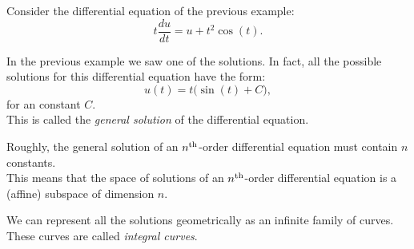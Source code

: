 \begin{example}
Consider the differential equation of the previous example:
$$
t \frac{du}{dt} = u + t^2 \cos(t).
$$

In the previous example we saw one of the solutions. In fact, all the possible solutions for this differential equation have the form:
$$
u(t) = t \big(\sin(t) + C \big),
$$
for an constant $C$. \\

This is called the \emph{general solution} of the differential equation.
\end{example}

\begin{graybox}
Roughly, the general solution of an $n^{\rm th}$-order differential equation must contain $n$ constants. \\

This means that the space of solutions of an $n^{\rm th}$-order differential equation is a (affine) subspace of dimension $n$.
\end{graybox}





\begin{definition}
	We can represent all the solutions geometrically as an infinite family of curves. These curves are called \emph{integral curves}.
\end{definition}

